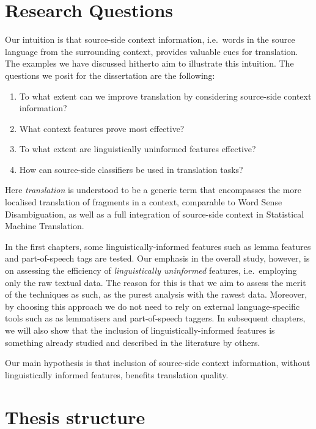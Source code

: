 \section{Research Questions}
\label{sec:overallresearchquestion}

Our intuition is that source-side context information, i.e.\ words in the
source language from the surrounding context, provides valuable cues for
translation. The examples we have discussed hitherto aim to illustrate this
intuition. The questions we posit for the dissertation are the following:

\begin{enumerate}
\item To what extent can we improve translation by considering source-side
    context information?
\item What context features prove most effective?
\item To what extent are linguistically uninformed features effective?
\item How can source-side classifiers be used in translation tasks?
\end{enumerate}

Here \emph{translation} is understood to be a generic term that
encompasses the more localised translation of fragments in a
context, comparable to Word Sense Disambiguation, as well as a full integration
of source-side context in Statistical Machine Translation.

In the first chapters, some linguistically-informed features such as lemma
features and part-of-speech tags are tested. Our emphasis in the overall study,
however, is on assessing the efficiency of \emph{linguistically uninformed}
features, i.e.\ employing only the raw textual data. The reason for this is that we
aim to assess the merit of the techniques as such, as the purest analysis with the rawest data. Moreover, by choosing this approach we do
not need to rely on external language-specific tools such as as lemmatisers and
part-of-speech taggers. In subsequent chapters, we will also show that the
inclusion of linguistically-informed features is something already studied and
described in the literature by others.

Our main hypothesis is that inclusion of source-side context information, without
linguistically informed features, benefits translation quality.

\section{Thesis structure}

